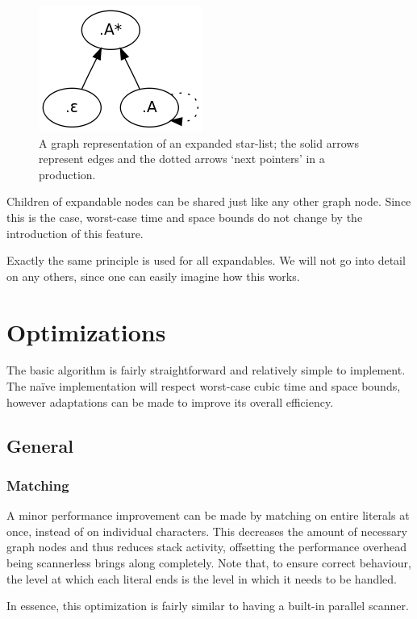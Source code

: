 \documentclass[a4paper,10pt]{article}
\begin{document}
\begin{figure}[H]
\centering
\includegraphics[scale=0.5]{star-list.png}
\caption{A graph representation of an expanded star-list; the solid arrows represent edges and the dotted arrows `next pointers' in a production.}
\end{figure}

Children of expandable nodes can be shared just like any other graph node. Since this is the case, worst-case time and space bounds do not change by the introduction of this feature.

Exactly the same principle is used for all expandables. We will not go into detail on any others, since one can easily imagine how this works.

\section{Optimizations}
\label{chap:optimizations}

The basic algorithm is fairly straightforward and relatively simple to implement. The naïve implementation will respect worst-case cubic time and space bounds, however adaptations can be made to improve its overall efficiency.

\subsection{General}

\subsubsection{Matching}
A minor performance improvement can be made by matching on entire literals at once, instead of on individual characters. This decreases the amount of necessary graph nodes and thus reduces stack activity, offsetting the performance overhead being scannerless brings along completely. Note that, to ensure correct behaviour, the level at which each literal ends is the level in which it needs to be handled.

In essence, this optimization is fairly similar to having a built-in parallel scanner.
\end{document}
